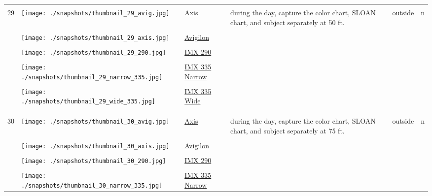 \documentclass{article}%
\begin{document}
\begin{longtabu}{m{2.5cm} m{4cm} m{2cm} m{4cm} m{2cm} m{2cm}}
&&&&&\\%
\hline%
&&&&&\\%
29&\texttt{[image: ./snapshots/thumbnail\_29\_avig.jpg]}&\href{https://drive.google.com/file/d/1IEBiYsmqy4WSVvbr4eBzbolqAXHmit98/view?usp=sharing}{Axis}&during the day, capture the color chart, SLOAN chart, and subject separately at 50 ft.&outside&n\\%
&&&&&\\%
&\texttt{[image: ./snapshots/thumbnail\_29\_axis.jpg]}&\href{https://drive.google.com/file/d/1Khmyl9DE20HgnTvuMxXavVoFxrFhir69/view?usp=sharing}{Avigilon}&&&\\%
&&&&&\\%
&\texttt{[image: ./snapshots/thumbnail\_29\_290.jpg]}&\href{https://drive.google.com/file/d/1PaxqcAglb7RG8_ddowIkee-Sbzof_yMi/view?usp=sharing}{IMX 290}&&&\\%
&&&&&\\%
&\texttt{[image: ./snapshots/thumbnail\_29\_narrow\_335.jpg]}&\href{https://drive.google.com/file/d/1LC4qx0e6tltCQawePkngAaBPskuFh5V7/view?usp=sharing}{IMX 335 Narrow}&&&\\%
&&&&&\\%
&\texttt{[image: ./snapshots/thumbnail\_29\_wide\_335.jpg]}&\href{https://drive.google.com/file/d/10MQUW0l6qIN-qpgMr_xY5SpFc5cBk2o8/view?usp=sharing}{IMX 335 Wide}&&&\\%
&&&&&\\%
&&&&&\\%
\hline%
&&&&&\\%
30&\texttt{[image: ./snapshots/thumbnail\_30\_avig.jpg]}&\href{https://drive.google.com/file/d/1Qob-4rT8c1gBhJdqC4PMf5S8Yeg2DD10/view?usp=sharing}{Axis}&during the day, capture the color chart, SLOAN chart, and subject separately at 75 ft.&outside&n\\%
&&&&&\\%
&\texttt{[image: ./snapshots/thumbnail\_30\_axis.jpg]}&\href{https://drive.google.com/file/d/1GOCm5c_2imIQCWHsZmDUD6MbWzB834R8/view?usp=sharing}{Avigilon}&&&\\%
&&&&&\\%
&\texttt{[image: ./snapshots/thumbnail\_30\_290.jpg]}&\href{https://drive.google.com/file/d/124HwjRpsYSn1qlt-v0U9zNZiIgRNBBYa/view?usp=sharing}{IMX 290}&&&\\%
&&&&&\\%
&\texttt{[image: ./snapshots/thumbnail\_30\_narrow\_335.jpg]}&\href{https://drive.google.com/file/d/1pqMoLw-JOg8BAjdPfAtm3xs95Qnn-76n/view?usp=sharing}{IMX 335 Narrow}&&&\\%

\end{longtabu}
\end{document}
